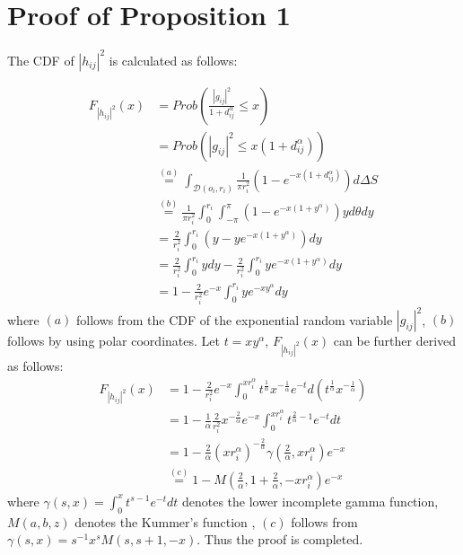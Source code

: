 \documentclass[journal]{IEEEtran}
\begin{document}
\appendices
\section{Proof of Proposition 1}
The CDF of $\left|h_{ij} \right|^2$ is calculated as follows:

\begin{align}
F_{\left|h_{ij} \right|^2} \left(x\right) &= Prob\left(\frac{\left|g_{ij}\right|^2}{1 + d_{ij}^{\alpha}} \leq x \right) \nonumber \\
& = Prob \left(\left|g_{ij}\right|^2 \leq x \left(1 + d_{ij}^\alpha\right)\right) \nonumber \\
& \overset{\left(a\right)}{=} \int_{\mathcal{D}(o_i, r_i)} \frac{1}{\pi r_i^2}\left(1 - e^{-x\left(1 + d_{ij}^{\alpha}\right)}\right) d\Delta S \nonumber\\
& \overset{\left(b\right)}{=} \frac{1}{\pi r_i^2} \int_{0}^{r_i} \int_{-\pi}^{\pi}\left(1 - e^{-x\left(1 + y^{\alpha}\right)}\right)y d \theta d y \nonumber \\
& = \frac{2}{r_i^2}\int_{0}^{r_i} \left(y - ye^{-x\left(1 + y^\alpha\right)}\right) dy \nonumber \\
& = \frac{2}{r_i^2}\int_{0}^{r_i}y dy - \frac{2}{r_i^2}\int_{0}^{r_i} y e^{-x \left(1 + y^\alpha\right)}dy \nonumber \\
& = 1 - \frac{2}{r_i^2}e^{-x} \int_{0}^{r_i}y e^{-xy^{\alpha}}dy
\end{align}
where $\left(a\right)$ follows from the CDF of the exponential random variable $\left|g_{ij}\right|^2$, $\left(b\right)$ follows by using polar coordinates. Let $t = xy^{\alpha}$, $F_{\left|h_{ij} \right|^2} \left(x\right)$ can be further derived as follows:
\begin{align}
F_{\left|h_{ij} \right|^2} \left(x\right) &= 1 - \frac{2}{r_i^2}e^{-x} \int_{0}^{x r_i^{\alpha}} t^{\frac{1}{\alpha}} x^{-\frac{1}{\alpha}}e^{-t} d\left(t^{\frac{1}{\alpha}} x^{-\frac{1}{\alpha}}\right) \nonumber \\
& = 1 - \frac{1}{\alpha} \frac{2}{r_i^2} x^{-\frac{2}{\alpha}} e^{-x} \int_{0}^{x r_i^{\alpha}} t^{\frac{2}{\alpha} - 1}e^{-t} dt \nonumber \\
& = 1 - \frac{2}{\alpha} \left(x r_i^{\alpha}\right) ^{-\frac{2}{\alpha}} \gamma\left(\frac{2}{\alpha}, xr_i^{\alpha}\right)e^{-x} \nonumber \\
& \overset{\left(c\right)}{=} 1 - M\left(\frac{2}{\alpha}, 1 + \frac{2}{\alpha}, -xr_i^{\alpha}\right)e^{-x}
\end{align}
where $\gamma\left(s,x\right) = \int_{0}^{x}t^{s-1}e^{-t}dt$ denotes the lower incomplete gamma function, $M\left(a,b,z\right)$ denotes the Kummer's function \cite{MAbramowitz}, $\left(c\right)$ follows from $\gamma\left(s,x\right) = s^{-1} x^s M\left(s,s+1,-x\right)$. Thus the proof is completed. 
\end{document}
